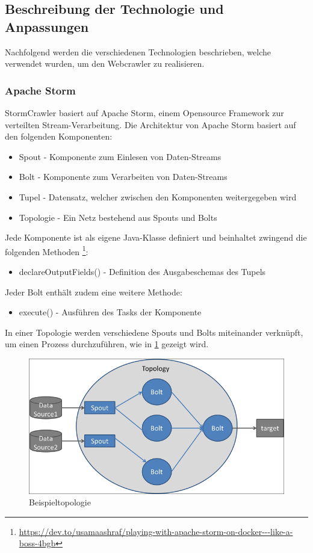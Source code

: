 \subsection{Beschreibung der Technologie und Anpassungen}
Nachfolgend werden die verschiedenen Technologien beschrieben, welche verwendet wurden, um den Webcrawler zu realisieren.
\subsubsection{Apache Storm}
StormCrawler basiert auf Apache Storm, einem Opensource Framework zur verteilten Stream-Verarbeitung.
Die Architektur von Apache Storm basiert auf den folgenden Komponenten:
\begin{itemize}
	\item Spout - Komponente zum Einlesen von Daten-Streams
	\item Bolt - Komponente zum Verarbeiten von Daten-Streams
	\item Tupel - Datensatz, welcher zwischen den Komponenten weitergegeben wird
	\item Topologie - Ein Netz bestehend aus Spouts und Bolts
\end{itemize}
Jede Komponente ist als eigene Java-Klasse definiert und beinhaltet zwingend die folgenden Methoden \footnote{\url{https://dev.to/usamaashraf/playing-with-apache-storm-on-docker---like-a-boss-4bgb}}:
\begin{itemize}
	\item declareOutputFields() - Definition des Ausgabeschemas des Tupels
\end{itemize}
Jeder Bolt enthält zudem eine weitere Methode:
\begin{itemize}
	\item execute() - Ausführen des Tasks der Komponente
\end{itemize}
In einer Topologie werden verschiedene Spouts und Bolts miteinander verknüpft, um einen Prozess durchzuführen, wie in \cref{fig:topology} gezeigt wird.
\begin{figure}[H]	
	\includegraphics[width=0.8\columnwidth,keepaspectratio]{img/storm-topology.png}
	\caption{Beispieltopologie}
	\label{fig:topology}
\end{figure}

